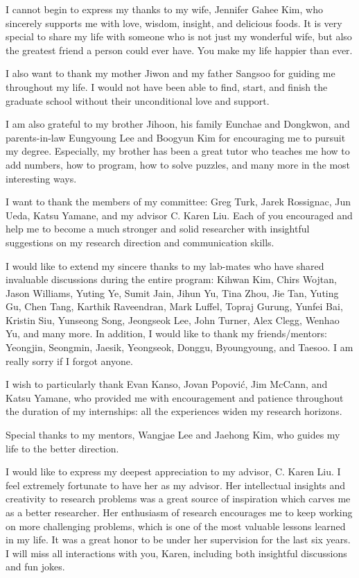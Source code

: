 I cannot begin to express my thanks to my wife, Jennifer Gahee Kim,
who sincerely supports me with love, wisdom, insight, and delicious foods.
It is very special to share my life with someone who is not just my wonderful
wife, but also the greatest friend a person could ever have.
You make my life happier than ever.

I also want to thank my mother Jiwon and my father Sangsoo for guiding me
throughout my life.
I would not have been able to find, start, and finish the graduate school without
their unconditional love and support.

I am also grateful to my brother Jihoon, his family Eunchae and Dongkwon,
and parents-in-law Eungyoung Lee and Boogyun Kim for encouraging me to pursuit
my degree.
Especially, my brother has been a great tutor who teaches me
how to add numbers, how to program, how to solve puzzles, and many more
in the most interesting ways.

I want to thank the members of my committee: Greg Turk, Jarek Rossignac,
Jun Ueda, Katsu Yamane, and my advisor C. Karen Liu.
Each of you encouraged and help me to become a much stronger and solid
researcher with insightful suggestions on my research direction and
communication skills.

I would like to extend my sincere thanks to my lab-mates
who have shared invaluable discussions during the entire program:
Kihwan Kim, Chirs Wojtan, Jason Williams, Yuting Ye, Sumit Jain,
Jihun Yu, Tina Zhou, Jie Tan, Yuting Gu, Chen Tang, Karthik Raveendran, 
Mark Luffel, Topraj Gurung, Yunfei Bai, Kristin Siu, Yunseong Song,
Jeongseok Lee, John Turner, Alex Clegg, Wenhao Yu, and many more.
In addition, I would like to thank my friends/mentors: Yeongjin, Seongmin,
Jaesik, Yeongseok, Donggu, Byoungyoung, and Taesoo.
I am really sorry if I forgot anyone.

I wish to particularly thank Evan Kanso, Jovan Popovi\'{c}, Jim McCann, and
Katsu Yamane, who provided me with encouragement and patience throughout the
duration of my internships: all the experiences widen my research horizons.

Special thanks to my mentors, Wangjae Lee and Jaehong Kim, who
guides my life to the better direction.

I would like to express my deepest appreciation to my advisor, C. Karen Liu.
I feel extremely fortunate to have her as my advisor.
Her intellectual insights and creativity to research problems was a great
source of inspiration which carves me as a better researcher.
Her enthusiasm of research encourages me to keep working on more challenging
problems, which is one of the most valuable lessons learned in my life.
It was a great honor to be under her supervision for the last six years.
I will miss all interactions with you, Karen, 
including both insightful discussions and fun jokes. 












